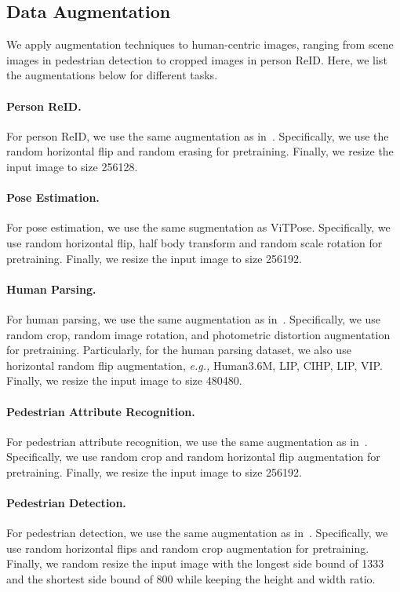\documentclass[10pt,twocolumn,letterpaper]{article}
\begin{document}
\subsection{Data Augmentation}
We apply augmentation techniques to human-centric images, ranging from scene images in pedestrian detection to cropped images in person ReID. Here, we list the augmentations below for different tasks.

\paragraph{Person ReID.} For person ReID, we use the same augmentation as in~\cite{luo2019bag}. Specifically, we use the random horizontal flip and random erasing for pretraining. Finally, we resize the input image to size 256128.

\paragraph{Pose Estimation.} 
For pose estimation, we use the same sugmentation as ViTPose\cite{xu2022vitpose}. Specifically, we use random horizontal flip, half body transform and random scale rotation for pretraining. Finally, we resize the input image to size 256192.

\paragraph{Human Parsing.}
For human parsing, we use the same augmentation as in~\cite{gong2018instance}. Specifically, we use random crop, random image rotation, and photometric distortion augmentation for pretraining. Particularly, for the human parsing dataset, we also use horizontal random flip augmentation, \emph{e.g.,} Human3.6M, LIP, CIHP, LIP, VIP. Finally, we resize the input image to size 480480.

\paragraph{Pedestrian Attribute Recognition.}
For pedestrian attribute recognition, we use the same augmentation as in~\cite{li2022label2label}. Specifically, we use random crop and random horizontal flip augmentation for pretraining. Finally, we resize the input image to size 256192.

\paragraph{Pedestrian Detection.}
For pedestrian detection, we use the same augmentation as in~\cite{zheng2022progressive}. Specifically, we use random horizontal flips and random crop augmentation for pretraining. Finally, we random resize the input image with the longest side bound of 1333 and the shortest side bound of 800 while keeping the height and width ratio.
\end{document}
